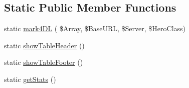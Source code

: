 \subsection*{Static Public Member Functions}
\begin{DoxyCompactItemize}
\item 
static \hyperlink{class_hero_afedf929b889d53bc2ce666ad5288aca0}{mark4\+DL} ( \$Array, \$Base\+U\+RL, \$Server, \$Hero\+Class)
\item 
static \hyperlink{class_hero_a60b7fc5e4c44832919909e172c309c4b}{show\+Table\+Header} ()
\item 
static \hyperlink{class_hero_a811e2707d4416d4f7186315a53c545d6}{show\+Table\+Footer} ()
\item 
static \hyperlink{class_hero_a183b471423aa1b3f59032e25683fd834}{get\+Stats} ()
\end{DoxyCompactItemize}

